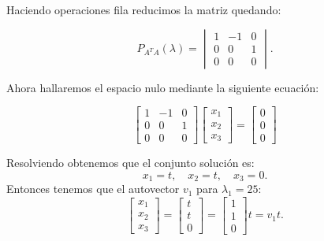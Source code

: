 \begin{frame}
	\begin{solution}
		Haciendo operaciones fila reducimos la matriz quedando:

		\begin{equation*}
			P_{A^{T}A}
			\left(\lambda\right)=
			\begin{vmatrix}
				1 & -1 & 0 \\
				0 & 0  & 1 \\
				0 & 0  & 0
			\end{vmatrix}.
		\end{equation*}

		Ahora hallaremos el espacio nulo mediante la siguiente ecuación:

		\begin{equation*}
			\begin{bmatrix}
				1 & -1 & 0 \\
				0 & 0  & 1 \\
				0 & 0  & 0
			\end{bmatrix}
			\begin{bmatrix}
				x_{1} \\
				x_{2} \\
				x_{3}
			\end{bmatrix}=
			\begin{bmatrix}
				0 \\
				0 \\
				0
			\end{bmatrix}
		\end{equation*}

		Resolviendo obtenemos que el conjunto solución es:
		\begin{equation*}
			x_{1}=t,\quad
			x_{2}=t,\quad
			x_{3}=0.
		\end{equation*}
		Entonces tenemos que el autovector $v_{1}$ para $\lambda_{1}=25$:
		\begin{equation*}
			\begin{bmatrix}
				x_{1} \\
				x_{2} \\
				x_{3}
			\end{bmatrix}
			=
			\begin{bmatrix}
				t \\
				t \\
				0
			\end{bmatrix} =
			\begin{bmatrix}
				1 \\
				1 \\
				0
			\end{bmatrix}t=
			v_{1}t.
		\end{equation*}
	\end{solution}
\end{frame}

